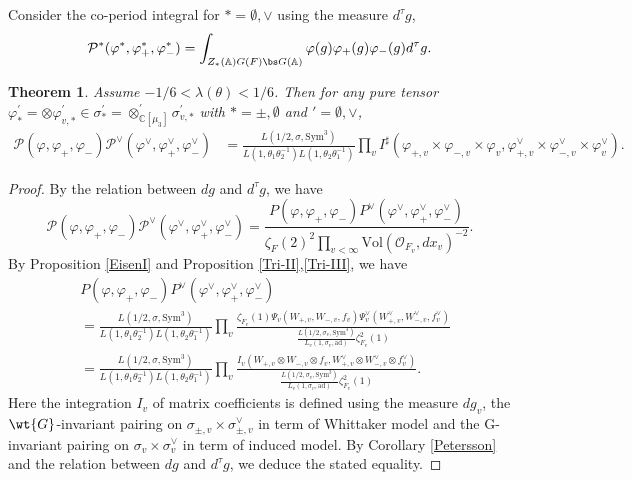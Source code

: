 \documentclass[11pt,reqno]{amsart}
\newcommand{\BA}{{\mathbb {A}}} \newcommand{\BB}{{\mathbb {B}}}
\newcommand{\BC}{{\mathbb {C}}} \newcommand{\BD}{{\mathbb {D}}}
\newcommand{\CO}{{\mathcal {O}}} \newcommand{\CP}{{\mathcal {P}}}
\newcommand{\ad}{{\mathrm{ad}}}\newcommand{\al}{{\mathrm{al}}}
\newcommand{\Sym}{{\mathrm{Sym}}}\newcommand{\sgn}{{\mathrm{sgn}}}
\newcommand{\Vol}{{\mathrm{Vol}}}\newcommand{\vol}{{\mathrm{vol}}}
\theoremstyle{plain}
\newtheorem{thm}{Theorem}[section] \newtheorem{cor}[thm]{Corollary}
\theoremstyle{remark} \newtheorem{remark}[thm]{Remark}
\theoremstyle{definition} \newtheorem{exercise}[thm]{Exercise}
\theoremstyle{definition} \newtheorem{example}[thm]{Example} \newtheorem{condition}[thm]{Condition}
\numberwithin{equation}{section}
\renewcommand{\-}{\text{--}}
\begin{document}
Consider the co-period integral for $*=\emptyset,\vee$ using the measure $d^\tau g$,\[\CP^*(\varphi^*,\varphi_+^*,\varphi_-^*)=\int_{Z_*(\BA)G(F)\bs G(\BA)}\varphi(g)\varphi_+(g)\varphi_-(g)d^\tau g.\]
\begin{thm}\label{EisenII}Assume $-1/6<\lambda(\theta)<1/6$. Then for any pure tensor $\varphi_*^\prime=\otimes \varphi_{v,*}^\prime\in\sigma_*^\prime=\otimes_{\BC[\mu_3]}^\prime \sigma_{v,*}^\prime $ with $*=\pm,\emptyset$ and $\prime=\emptyset,\vee$, 
\begin{align*}
\CP(\varphi,\varphi_+,\varphi_-)\CP^\vee(\varphi^\vee,\varphi_+^\vee,\varphi_-^\vee)&=\frac{L(1/2,\sigma,\Sym^3)}{L(1,\theta_1\theta_2^{-1})L(1,\theta_2\theta_1^{-1})} \prod_v I^\sharp(\varphi_{+,v}\times \varphi_{-,v}\times \varphi_v, \varphi_{+,v}^\vee\times \varphi_{-,v}^\vee\times \varphi_v^\vee).
\end{align*}


\end{thm}
\begin{proof}By the relation between $dg$ and $d^\tau g$, we have 
\[\CP(\varphi,\varphi_+,\varphi_-)\CP^\vee(\varphi^\vee,\varphi_+^\vee,\varphi_-^\vee)=\frac{P(\varphi,\varphi_+,\varphi_-)P^\vee(\varphi^\vee,\varphi_+^\vee,\varphi_-^\vee)}{\zeta_F(2)^2\prod_{v<\infty}\Vol(\CO_{F_v},dx_v)^{-2}}.\]
By Proposition \ref{EisenI} and Proposition \ref{Tri-II},\ref{Tri-III}, we have 
\begin{align*}&P(\varphi,\varphi_+,\varphi_-)P^\vee(\varphi^\vee,\varphi_+^\vee,\varphi_-^\vee)\\
&=\frac{L(1/2,\sigma,\Sym^3)}{L(1,\theta_1\theta_2^{-1})L(1,\theta_2\theta_1^{-1})}\prod_v\frac{\zeta_{F_v}(1)\Psi_v(W_{+,v},W_{-,v},f_v)\Psi_v^\vee(W_{+,v}^\vee,W_{-,v}^\vee,f_v^\vee)}{\frac{L(1/2,\sigma_v,\Sym^3)}{L_v(1,\sigma_v,\ad)}\zeta_{F_v}^2(1)}\\
&=\frac{L(1/2,\sigma,\Sym^3)}{L(1,\theta_1\theta_2^{-1})L(1,\theta_2\theta_1^{-1})}\prod_v\frac{I_v(W_{+,v}\otimes W_{-,v}\otimes f_v,W_{+,v}^\vee\otimes W_{-,v}^\vee\otimes f_v^\vee)}{\frac{L(1/2,\sigma_v,\Sym^3)}{L_v(1,\sigma_v,\ad)}\zeta_{F_v}^2(1)}.
\end{align*}
Here the integration $I_v$ of matrix coefficients is defined using the measure  $d g_v$, the $\wt{G}$-invariant pairing on $\sigma_{\pm,v}\times\sigma_{\pm,v}^\vee$ in term of Whittaker model and the G-invariant pairing on $\sigma_v\times\sigma_v^\vee$ in term of induced model. By Corollary \ref{Petersson} and the relation between $dg$ and $d^\tau g$, we deduce the stated equality.
\end{proof}
\end{document}

